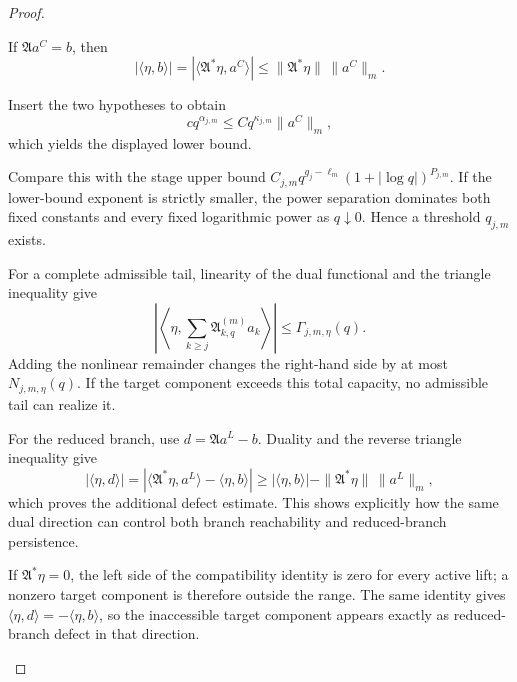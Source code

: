 \documentclass[12pt]{article}
\theoremstyle{plain}
\theoremstyle{definition}
\theoremstyle{remark}
\newcommand{\Comp}{\mathfrak A}
\begin{document}
\begin{proof}
\begin{prooflines}
\item If \(\Comp a^C=b\), then
\[
|\langle\eta,b\rangle|=|\langle\Comp^*\eta,a^C\rangle|
\le\|\Comp^*\eta\|\,\|a^C\|_m.
\]
\item Insert the two hypotheses to obtain
\[
cq^{\alpha_{j,m}}\le Cq^{\kappa_{j,m}}\|a^C\|_m,
\]
which yields the displayed lower bound.
\item Compare this with the stage upper bound \(C_{j,m}q^{g_j-\ell_m}(1+|\log q|)^{P_{j,m}}\). If the lower-bound exponent is strictly smaller, the power separation dominates both fixed constants and every fixed logarithmic power as \(q\downarrow0\). Hence a threshold \(q_{j,m}\) exists.
\item For a complete admissible tail, linearity of the dual functional and the triangle inequality give
\[
\left|\left\langle\eta,\sum_{k\ge j}\Comp_{k,q}^{(m)}a_k\right\rangle\right|
\le\Gamma_{j,m,\eta}(q).
\]
Adding the nonlinear remainder changes the right-hand side by at most \(N_{j,m,\eta}(q)\). If the target component exceeds this total capacity, no admissible tail can realize it.
\item For the reduced branch, use \(d=\Comp a^L-b\). Duality and the reverse triangle inequality give
\[
|\langle\eta,d\rangle|
=|\langle\Comp^*\eta,a^L\rangle-\langle\eta,b\rangle|
\ge |\langle\eta,b\rangle|-\|\Comp^*\eta\|\,\|a^L\|_m,
\]
which proves the additional defect estimate. This shows explicitly how the same dual direction can control both branch reachability and reduced-branch persistence.
\item If \(\Comp^*\eta=0\), the left side of the compatibility identity is zero for every active lift; a nonzero target component is therefore outside the range. The same identity gives \(\langle\eta,d\rangle=-\langle\eta,b\rangle\), so the inaccessible target component appears exactly as reduced-branch defect in that direction.
\end{prooflines}
\end{proof}
\end{document}
